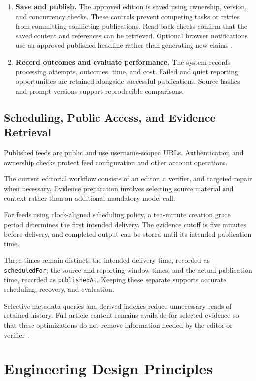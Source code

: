 \begin{enumerate}
    \item \textbf{Save and publish.}
    The approved edition is saved using ownership, version, and concurrency checks. These controls prevent competing tasks or retries from committing conflicting publications. Read-back checks confirm that the saved content and references can be retrieved. Optional browser notifications use an approved published headline rather than generating new claims \cite{notificationeval}.

    \item \textbf{Record outcomes and evaluate performance.}
    The system records processing attempts, outcomes, time, and cost. Failed and quiet reporting opportunities are retained alongside successful publications. Source hashes and prompt versions support reproducible comparisons.
\end{enumerate}

\subsection{Scheduling, Public Access, and Evidence Retrieval}

Published feeds are public and use username-scoped URLs. Authentication and ownership checks protect feed configuration and other account operations.

The current editorial workflow consists of an editor, a verifier, and targeted repair when necessary. Evidence preparation involves selecting source material and context rather than an additional mandatory model call.

For feeds using clock-aligned scheduling policy, a ten-minute creation grace period determines the first intended delivery. The evidence cutoff is five minutes before delivery, and completed output can be stored until its intended publication time.

Three times remain distinct: the intended delivery time, recorded as \texttt{scheduledFor}; the source and reporting-window times; and the actual publication time, recorded as \texttt{publishedAt}. Keeping these separate supports accurate scheduling, recovery, and evaluation.

Selective metadata queries and derived indexes reduce unnecessary reads of retained history. Full article content remains available for selected evidence so that these optimizations do not remove information needed by the editor or verifier \cite{selectivereads,boundedhistory}.

\section{Engineering Design Principles}

